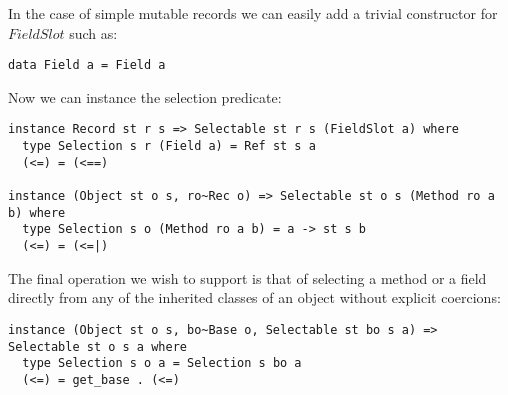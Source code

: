 In the case of simple mutable records we can easily add a trivial constructor for $FieldSlot$ such as:
\begin{lstlisting}
data Field a = Field a
\end{lstlisting}

Now we can instance the selection predicate:
\begin{lstlisting}
instance Record st r s => Selectable st r s (FieldSlot a) where
  type Selection s r (Field a) = Ref st s a
  (<=) = (<==)

instance (Object st o s, ro~Rec o) => Selectable st o s (Method ro a b) where
  type Selection s o (Method ro a b) = a -> st s b
  (<=) = (<=|)
\end{lstlisting}

The final operation we wish to support is that of selecting a method or a field directly from any of the inherited classes of an object without explicit coercions:
\begin{lstlisting}
instance (Object st o s, bo~Base o, Selectable st bo s a) => Selectable st o s a where
  type Selection s o a = Selection s bo a
  (<=) = get_base . (<=)
\end{lstlisting}